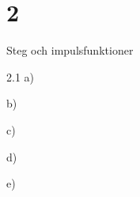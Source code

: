 \chapter{2}{Steg och impulsfunktioner}
\begin{task}{2.1 a)}
\end{task}

\begin{task}{b)}
\end{task}

\begin{task}{c)}
\end{task}

\begin{task}{d)}
\end{task}

\begin{task}{e)}
\end{task}

\begin{task}{2.2}
\end{task}